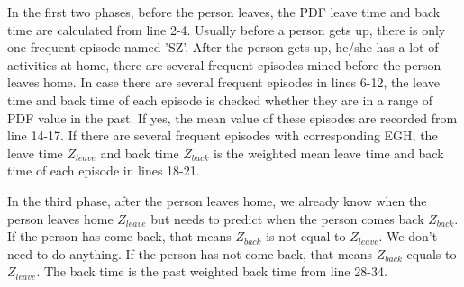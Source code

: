 In the first two phases, before the person leaves, 
the PDF leave time and back time are calculated from line 2-4. 
Usually before a person gets up, there is only one frequent episode named 'SZ'. 
After the person gets up, he/she has a lot of activities at home, 
there are several frequent episodes mined before the person leaves home. 
In case there are several frequent episodes in lines 6-12, 
the leave time and back time of each episode is checked
whether they are in a range of PDF value in the past. 
If yes, the mean value of these episodes are recorded from line 14-17. 
If there are several frequent episodes with corresponding EGH, 
the leave time $Z_{leave}$ and back time $Z_{back}$ is the weighted 
mean leave time and back time of each episode in lines 18-21. 

In the third phase, after the person leaves home, 
we already know when the person leaves home $Z_{leave}$ 
but needs to predict when the person comes back $Z_{back}$. 
If the person has come back, that means $Z_{back}$ is not equal to $Z_{leave}$. 
We don't need to do anything. 
If the person has not come back, that means $Z_{back}$ equals to $Z_{leave}$. 
The back time is the past weighted back time from line 28-34. 


 





